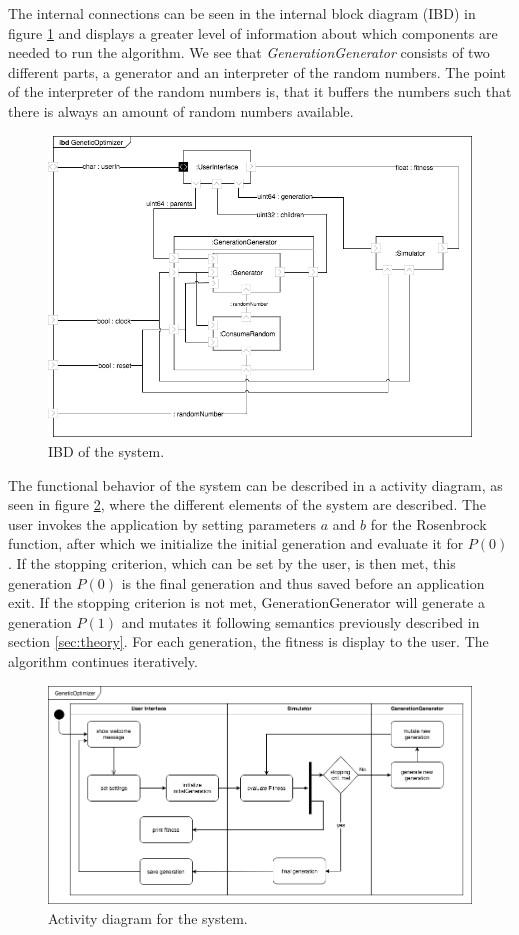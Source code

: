 The internal connections can be seen in the internal block diagram (IBD) in figure \ref{fig:ibd} and displays a greater level of information about which components are needed to run the algorithm. We see that \emph{GenerationGenerator} consists of two different parts, a generator and an interpreter of the random numbers. The point of the interpreter of the random numbers is, that it buffers the numbers such that there is always an amount of random numbers available.

\begin{figure}[h!]
	\centering
	\includegraphics[width=\linewidth]{../diagrams/ibd.png}
	\caption{IBD of the system.}
	\label{fig:ibd}
\end{figure}

The functional behavior of the system can be described in a activity diagram, as seen in figure \ref{fig:activity}, where the different elements of the system are described. The user invokes the application by setting parameters $a$ and $b$ for the Rosenbrock function, after which we initialize the initial generation and evaluate it for $P(0)$. If the stopping criterion, which can be set by the user, is then met, this generation $P(0)$ is the final generation and thus saved before an application exit. If the stopping criterion is not met, GenerationGenerator will generate a generation $P(1)$ and mutates it following semantics previously described in section \ref{sec:theory}. For each generation, the fitness is display to the user. The algorithm continues iteratively.

\begin{figure}[h!]
	\centering
	\includegraphics[width=0.9\linewidth]{../diagrams/overallActivity.png}
	\caption{Activity diagram for the system.}
	\label{fig:activity}
\end{figure}

